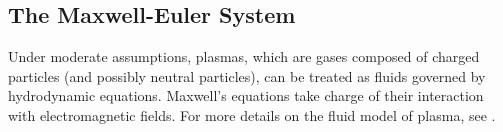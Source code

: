 \documentclass{article}
\begin{document}

\subsection{The Maxwell-Euler System}
Under moderate assumptions, plasmas, which are gases composed of charged particles (and possibly neutral particles), can be treated as fluids governed by hydrodynamic equations. Maxwell's equations take charge of their interaction with electromagnetic fields. For more details on the fluid model of plasma, see \cite{chen2016, remi_2014}.
\end{document}
